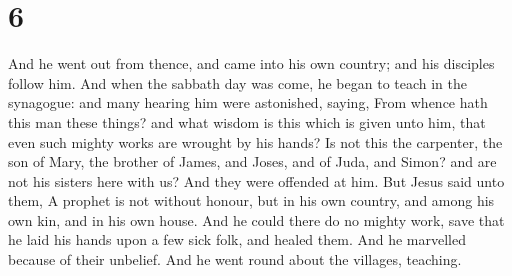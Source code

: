 \hypertarget{section-5}{%
\section{6}\label{section-5}}

 And he went out from thence, and came into his own country;
and his disciples follow him.  And when the sabbath day was
come, he began to teach in the synagogue: and many hearing him were
astonished, saying, From whence hath this man these things? and what
wisdom is this which is given unto him, that even such mighty works are
wrought by his hands?  Is not this the carpenter, the son of
Mary, the brother of James, and Joses, and of Juda, and Simon? and are
not his sisters here with us? And they were offended at him.
 But Jesus said unto them, A prophet is not without honour,
but in his own country, and among his own kin, and in his own house.
 And he could there do no mighty work, save that he laid his
hands upon a few sick folk, and healed them.  And he
marvelled because of their unbelief. And he went round about the
villages, teaching.

